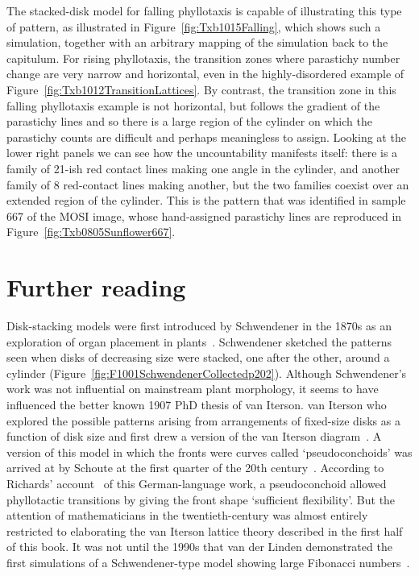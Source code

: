 The stacked-disk model for falling phyllotaxis is  capable of illustrating this type of pattern, as illustrated in Figure~\ref{fig:Txb1015Falling}, which 
shows such a simulation, together with an arbitrary mapping of the simulation back to the capitulum. 
For rising phyllotaxis, the transition zones where parastichy number change are very narrow and horizontal, even in the highly-disordered example of Figure~\ref{fig:Txb1012TransitionLattices}. By contrast, the transition zone in this falling phyllotaxis example is not horizontal, but follows the gradient of the parastichy lines and so  there is a large region of the cylinder on which the parastichy counts are difficult and perhaps meaningless to assign. Looking at the lower right panels we can see how the uncountability manifests itself: there is a family of 21-ish red contact lines making one angle in the cylinder, and another family of 8 red-contact lines making another, but the two families coexist over an extended region of the cylinder. This is the pattern that was identified in sample 667 of the MOSI image, whose hand-assigned parastichy lines are reproduced in Figure~\ref{fig:Txb0805Sunflower667}.
 
\section{Further reading}Disk-stacking models were first introduced by Schwendener in the 1870s as an exploration of organ placement in plants~\cite{schwendenerMechanischeTheorieBlattstellungen1878}.  Schwendener sketched the patterns seen when disks of decreasing size were stacked, one after the other, around a cylinder (Figure~\ref{fig:F1001SchwendenerCollectedp202}).
Although Schwendener's work was not influential on mainstream plant morphology, it seems to have influenced the better known 1907 PhD thesis of van Iterson. van Iterson  who explored the possible patterns arising from arrangements of fixed-size disks as a function of disk size and first drew a version of the van Iterson diagram~\cite{vanitersonjrMathematischeUndMikroscopischAnatomische1907}. 
A version of this model in which the fronts were curves called `pseudoconchoids'  was  arrived at by Schoute at the first quarter of the 20th century~\cite{schouteUberPseudokonchoiden1913}. According to  Richards' account~\cite{richardsGeometryPhyllotaxisIts1948}  of this German-language work, a pseudoconchoid allowed phyllotactic transitions by giving the front shape `sufficient flexibility'. But 
the attention of mathematicians in the twentieth-century was almost entirely restricted to elaborating the van Iterson lattice theory described in the first half of this book.  It was not until the  1990s that van der Linden demonstrated the first simulations of a Schwendener-type model showing large Fibonacci numbers~\cite{vanderlindenCreatingPhyllotaxisDislodgement1990}.

